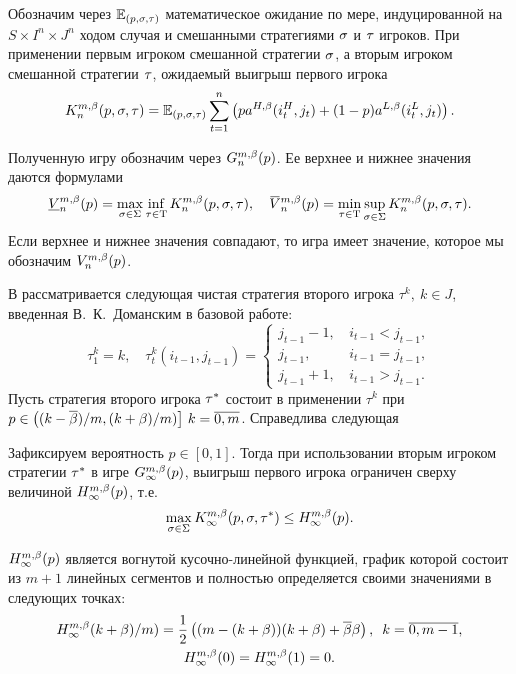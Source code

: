 Обозначим через $\operatorname{\mathbb{E}}_{(p,\sigma,\tau)}$ математическое ожидание по мере, индуцированной на $S \times I^n \times J^n$ ходом случая и смешанными стратегиями $\sigma$ и $\tau$ игроков.
При применении первым игроком смешанной стратегии $\sigma$, а вторым игроком смешанной стратегии $\tau$, ожидаемый выигрыш первого игрока
\begin{equation}
  \label{ch1:eq:firstPlayerPayoff}
  \K*{n}(p, \sigmar, \taur) = \E_{(p,\sigmar,\taur)} \sum_{t=1}^n
  \left(
    p \as[H](i_t^H, j_t) + (1 - p)\as[L](i_t^L, j_t)
  \right).
\end{equation}

Полученную игру обозначим через $\theG*{n}(p)$.
Ее верхнее и нижнее значения даются формулами
\begin{equation*}
  \LowV*{n}(p) = \max_{\sigmar \in \Sigma} \inf_{\taur \in \Tau}
  \K*{n}(p, \sigmar, \taur), \quad
  \HighV*{n}(p) = \min_{\taur \in \Tau} \sup_{\sigmar \in \Sigma}
  \K*{n}(p, \sigmar, \taur).
\end{equation*}
Если верхнее и нижнее значения совпадают, то игра имеет значение, которое мы обозначим $\V*{n}(p)$.

В  рассматривается следующая чистая стратегия второго игрока $\tau^k,\ k \in J$, введенная В.~К.~Доманским в базовой работе:
\[
  \tau^k_1 = k, \quad \tau^k_t(i_{t-1}, j_{t-1}) = \begin{cases}
    j_{t-1} - 1, & \, i_{t-1} < j_{t-1}, \\
    j_{t-1},     & \, i_{t-1} = j_{t-1}, \\
    j_{t-1} + 1, & \, i_{t-1} > j_{t-1}.
  \end{cases}
\]
Пусть стратегия второго игрока $\tau^*$ состоит в применении $\tau^k$ при $p \in \left( (k-{{\overline{\beta}}})/m, (k+\beta)/m) \right]\, k = \overline{0, m}$.
Справедлива следующая
\begin{theorem}
  Зафиксируем вероятность $p \in [0,1]$.
  Тогда при использовании вторым игроком стратегии $\tau^*$ в игре $\theG*{\infty}(p)$\textup{,} выигрыш первого игрока ограничен сверху величиной $\H*{\infty}(p)$, т.е.
  \[ 
    \max_{\sigmar \in \Sigma} \K*{\infty}(p, \sigmar, \taur^*) \leq \H*{\infty}(p).
  \]

  $\H*{\infty}(p)$ является вогнутой кусочно-линейной функцией, график которой состоит из $m+1$ линейных сегментов и полностью определяется своими значениями в следующих точках:
  \begin{gather*}
    \H*{\infty}(k+\Co)/m) = \frac{1}{2} \left( (m - (k + \Co))(k + \Co) + \DCo\Co \right),\enskip
    k = \overline{0, m - 1},\\
    \H*{\infty}(0) = \H*{\infty}(1) = 0.
  \end{gather*}
\end{theorem}

